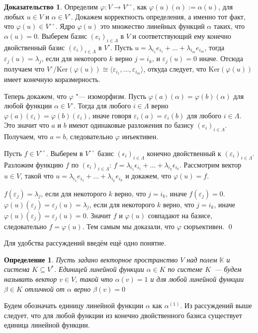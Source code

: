 \documentclass[a4paper, 12pt]{article}
\newtheorem*{definition}{Определение}
\theoremstyle{definition}
\newtheorem*{prof}{\hspace*{\parindent}Доказательство}
\begin{document}
\begin{prof}
    Определим $\varphi: V \to V^{\circ\circ}$, как $\varphi(u)(\alpha):= \alpha(u)$, для любых $u \in V$ и $\alpha \in V^\circ$. 
    Докажем корректность определения, а именно тот факт, что $\varphi(u) \in V^{\circ\circ}$.
    Ядро $\varphi(u)$ это множество линейных функций $\alpha$ таких, что $\alpha(u) = 0$.
    Выберем базис $(e_i)_{i \in \Lambda}$ в $V$ и соответствующий ему конечно двойственный базис $(\varepsilon_i)_{i \in \Lambda}$ в $V^\circ$. Пусть $u = \lambda_{i_1}e_{i_1}+ \dots +\lambda_{i_m}e_{i_m}$, тогда $\varepsilon_j(u) = \lambda_j$, если для некоторого $k$ верно $j=i_k$, и 
    $\varepsilon_j(u)= 0$ иначе. Отсюда получаем что $V^\circ/\mathrm{Ker}(\varphi(u)) \cong \langle\varepsilon_{i_1}, \dots , \varepsilon_{i_m} \rangle$, откуда следует, что $\mathrm{Ker}(\varphi(u))$ имеет конечную коразмерность.

    Теперь докажем, что $\varphi$ "--- изоморфизм.
    Пусть $\varphi(a)(\alpha) = \varphi(b)(\alpha)$ для любой функции $\alpha \in V^\circ$. 
    Тогда для любого $i \in \Lambda$ верно $\varphi(a)(\varepsilon_i)= \varphi(b)(\varepsilon_i)$, иначе говоря $\varepsilon_i(a) = \varepsilon_i(b)$ для любого  $i \in \Lambda$. Это значит что $a$ и $b$ имеют одинаковые разложения по базису $(e_i)_{i \in \Lambda}$. Получаем, что $a = b$, следовательно $\varphi$ инъективен.

    Пусть $f \in V^{\circ\circ}$. Выберем в $V^{\circ\circ}$ базис $(\epsilon_i)_{i \in \Lambda}$ конечно двойственный к $(\varepsilon_i)_{i \in \Lambda}$. 
    Разложим функцию $f$ по $(\epsilon_i)_{i \in \Lambda}$: $f = \lambda_{i_1}\epsilon_{i_1} + \dots + \lambda_{i_k}\epsilon_{i_k}$. 
    Рассмотрим вектор $u \in V$, такой что $u = \lambda_{i_1}e_{i_1} + \dots + \lambda_{i_k}e_{i_k}$ и докажем, что $\varphi(u) = f$.
    
    $f(\varepsilon_j) = \lambda_j$, если для некоторого $k$ верно, что $j = i_k$, иначе $f(\varepsilon_j) = 0$. $\varphi(u)(\varepsilon_j) = \varepsilon_j(u) = \lambda_j$, если для некоторого $k$ верно, что $j = i_k$, иначе $\varphi(u)(\varepsilon_j) = \varepsilon_j(u) = 0$.
    Значит $f$ и $\varphi(u)$ совпадают на базисе, следовательно $f = \varphi(u)$. Тем самым мы доказали, что $\varphi$ сюръективен. \qed
    
\end{prof}

Для удобства рассуждений введём ещё одно понятие.

\begin{definition}

Пусть задано векторное пространство $V$ над полем $\mathbb{K}$ и система $K \subseteq V^*$.
Единицей линейной функции $\alpha \in K$ по системе $K$~--- будем называть вектор $v\in V$, такой что $\alpha(v) = 1$ и для любой линейной функции $\beta \in K$ отличной от $\alpha$ верно $\beta(v) = 0$
\end{definition}
Будем обозначать единицу линейной функции $\alpha$ как $\alpha^{(1)}$.
Из рассуждений выше следует, что для любой функции из конечно двойственного базиса существует единица линейной функции.
\end{document}
